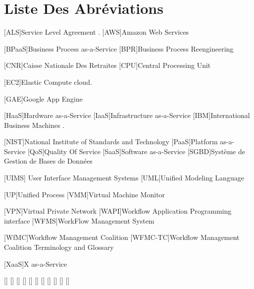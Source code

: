  
 \chapter*{Liste Des Abréviations}
 \begin{acronym}
 		{Service Level Agreement} .	 
 		{Amazon Web Services}
 		
 		    [BPaaS]{Business Process as-a-Service}	 
 		{Business Process Reengineering} 
 		
 		   {Caisse Nationale Des Retraites}
 			[CPU]{Central Processing Unit}
 		
 [EC2]{Elastic Compute cloud}.
 		
 		  	[GAE]{Google App Engine}	
 		
 		[HaaS]{Hardware as-a-Service}
 		[IaaS]{Infrastructure as-a-Service}	
 	[IBM]{International Business Machines}	 .
 	
 	
 	
 	    [NIST]{National Institute of Standards and Technology} 	
 	    			[PaaS]{Platform as-a-Service}	
 	   [QoS]{Quality Of Service}	 
 	   	[SaaS]{Software as-a-Service}	
 	   	  [SGBD]{Système de Gestion de Bases de Données}

    	
    	
 [UIMS]{ User Interface Management Systems}
 	       [UML]{Unified Modeling Language}

 	    	       [UP]{Unified Process}
[VMM]{Virtual Machine Monitor}  

 	  [VPN]{Virtual Private Network}
[WAPI]{Workflow Application Programming interface}
    	[WFMS]{WorkFlow Management System}
    	
    	
    	[WfMC]{Workflow Management Coalition }
    	[WFMC-TC]{Workflow Management Coalition Terminology and Glossary}		
    
	[XaaS]{X as-a-Service}	

 	  
 	  
 	  
 	  
 
 	       	  


 	       \acro{}[]{}
 	       \acro{}[]{}
 	       \acro{}[]{}
 	       \acro{}[]{}
 	       \acro{}[]{}
 	       \acro{}[]{}
 	       \acro{}[]{}
 	       \acro{}[]{}
 	       \acro{}[]{}
 	       \acro{}[]{}
 	       \acro{}[]{}
 	      
 	       
 \end{acronym}
 